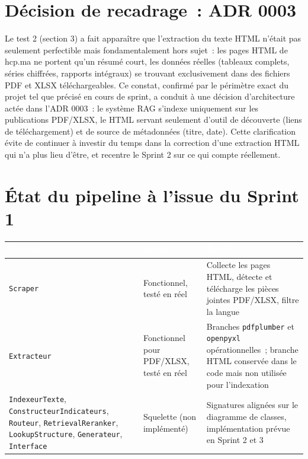 \documentclass[11pt,a4paper]{article}
\newcommand{\tblhead}[1]{\textcolor{white}{\textbf{#1}}}
\begin{document}
\section{D\'ecision de recadrage~: ADR 0003}
Le test 2 (section 3) a fait appara\^itre que l'extraction du texte HTML n'\'etait pas seulement perfectible mais fondamentalement hors sujet~: les pages HTML de hcp.ma ne portent qu'un r\'esum\'e court, les donn\'ees r\'eelles (tableaux complets, s\'eries chiffr\'ees, rapports int\'egraux) se trouvant exclusivement dans des fichiers PDF et XLSX t\'el\'echargeables. Ce constat, confirm\'e par le p\'erim\`etre exact du projet tel que pr\'ecis\'e en cours de sprint, a conduit \`a une d\'ecision d'architecture actée dans l'ADR 0003~: le syst\`eme RAG s'indexe uniquement sur les publications PDF/XLSX, le HTML servant seulement d'outil de d\'ecouverte (liens de t\'el\'echargement) et de source de m\'etadonn\'ees (titre, date). Cette clarification \'evite de continuer \`a investir du temps dans la correction d'une extraction HTML qui n'a plus lieu d'\^etre, et recentre le Sprint 2 sur ce qui compte r\'eellement.

\section{\'Etat du pipeline \`a l'issue du Sprint 1}
\begin{longtable}{@{}p{3.5cm}p{4.5cm}p{7.2cm}@{}}
\rowcolor{navy}
\tblhead{Module} & \tblhead{Statut} & \tblhead{D\'etail} \\
\midrule
\endhead
\texttt{Scraper} & Fonctionnel, test\'e en r\'eel & Collecte les pages HTML, d\'etecte et t\'el\'echarge les pi\`eces jointes PDF/XLSX, filtre la langue \\
\texttt{Extracteur} & Fonctionnel pour PDF/XLSX, test\'e en r\'eel & Branches \texttt{pdfplumber} et \texttt{openpyxl} op\'erationnelles~; branche HTML conserv\'ee dans le code mais non utilis\'ee pour l'indexation \\
\texttt{IndexeurTexte}, \texttt{ConstructeurIndicateurs}, \texttt{Routeur}, \texttt{RetrievalReranker}, \texttt{LookupStructure}, \texttt{Generateur}, \texttt{Interface} & Squelette (non impl\'ement\'e) & Signatures align\'ees sur le diagramme de classes, impl\'ementation pr\'evue en Sprint 2 et 3 \\
\end{longtable}
\end{document}
